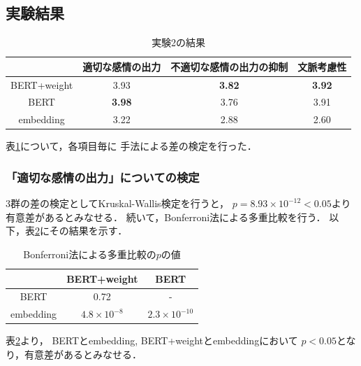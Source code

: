 	\subsection{実験結果}
	\begin{table}[H]
		\centering
		\caption{実験2の結果}
		\label{table:normal_word_result}
			\begin{tabular}{cccc}
				\hline
				& 適切な感情の出力 & 不適切な感情の出力の抑制 & 文脈考慮性 \\
				\hline \hline
				BERT+weight & 3.93 & \textbf{3.82} & \textbf{3.92} \\
				BERT & \textbf{3.98} & 3.76 & 3.91 \\
				embedding & 3.22 & 2.88 & 2.60 \\
				\hline
			\end{tabular}
	\end{table}

	表\ref{table:normal_word_result}について，各項目毎に
	手法による差の検定を行った．
	\subsubsection{「適切な感情の出力」についての検定}
		3群の差の検定としてKruskal-Wallis検定を行うと，
		$p=8.93\times10^{-12}<0.05$より有意差があるとみなせる．
		続いて，Bonferroni法\cite{bonferroni}による多重比較を行う．
		以下，表\ref{table:jikken2_good_Bonferroni}にその結果を示す．
		\begin{table}[H]
			\centering
			\caption{Bonferroni法による多重比較の$p$の値}
			\label{table:jikken2_good_Bonferroni}
			\begin{tabular}{|c|c|c|}
				\hline
				& BERT+weight & BERT \\
				\hline
				BERT & 0.72 & - \\
				\hline
				embedding & $4.8\times10^{-8}$ & $2.3\times10^{-10}$ \\
				\hline
			\end{tabular}
		\end{table}
		表\ref{table:jikken2_good_Bonferroni}より，
		BERTとembedding, BERT+weightとembeddingにおいて
		$p<0.05$となり，有意差があるとみなせる．
